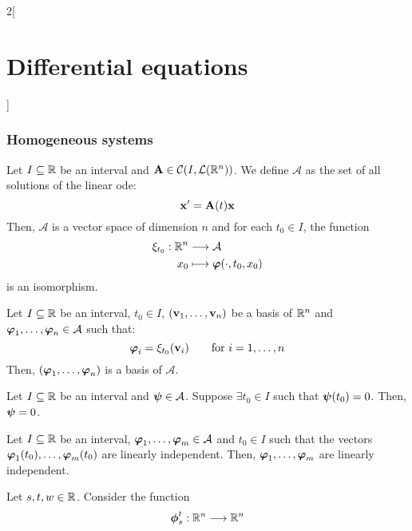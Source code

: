 \documentclass[../../../main.tex]{subfiles}
\begin{document}
\begin{multicols}{2}[\section{Differential equations}]
  \subsubsection{Homogeneous systems}
  \begin{theorem}
    Let $I\subseteq\mathbb{R}$ be an interval and $\boldsymbol{\mathrm{A}}\in\mathcal{C}(I,\mathcal{L}(\mathbb{R}^n))$. We define $\mathcal{A}$ as the set of all solutions of the linear ode:
    \begin{equation}\label{DE_homo}
      \boldsymbol{\mathrm{x}}'=\boldsymbol{\mathrm{A}}(t)\boldsymbol{\mathrm{x}}
    \end{equation} Then, $\mathcal{A}$ is a vector space of dimension $n$ and for each $t_0\in I$, the function
    \begin{align*}
      \xi_{t_0}:\mathbb{R}^n & \longrightarrow\mathcal{A}                         \\
      x_0             & \longmapsto\boldsymbol{\mathrm{\varphi}}(\cdot,t_0,x_0)
    \end{align*}
    is an isomorphism.
  \end{theorem}
  \begin{corollary}
    Let $I\subseteq\mathbb{R}$ be an interval, $t_0\in I$, $(\boldsymbol{\mathrm{v}}_1,\ldots,\boldsymbol{\mathrm{v}}_n)$ be a basis of $\mathbb{R}^n$ and $\boldsymbol{\mathrm{\varphi}}_1,\ldots,\boldsymbol{\mathrm{\varphi}}_n\in\mathcal{A}$ such that: $$\boldsymbol{\mathrm{\varphi}}_i=\xi_{t_0}(\boldsymbol{\mathrm{v}}_i)\qquad\text{for } i=1,\ldots,n$$
    Then, $(\boldsymbol{\mathrm{\varphi}}_1,\ldots,\boldsymbol{\mathrm{\varphi}}_n)$ is a basis of $\mathcal{A}$.
  \end{corollary}
  \begin{corollary}
    Let $I\subseteq\mathbb{R}$ be an interval and $\boldsymbol{\mathrm{\psi}}\in\mathcal{A}$. Suppose $\exists t_0\in I$ such that $\boldsymbol{\mathrm{\psi}} (t_0)=0$. Then, $\boldsymbol{\mathrm{\psi}}=0$.
  \end{corollary}
  \begin{corollary}
    Let $I\subseteq\mathbb{R}$ be an interval, $\boldsymbol{\mathrm{\varphi}}_1,\ldots,\boldsymbol{\mathrm{\varphi}}_m\in\mathcal{A}$ and $t_0\in I$ such that the vectors $\boldsymbol{\mathrm{\varphi}}_1(t_0),\ldots,\boldsymbol{\mathrm{\varphi}}_m(t_0)$ are linearly independent. Then, $\boldsymbol{\mathrm{\varphi}}_1,\ldots,\boldsymbol{\mathrm{\varphi}}_m$ are linearly independent.
  \end{corollary}
  \begin{corollary}
    Let $s,t,w\in\mathbb{R}$. Consider the function
    \begin{align*}
      \vectorfunction{\phi}_s^t:\RR^n & \longrightarrow\RR^n     \\

\end{align*}
\end{corollary}
\end{multicols}
\end{document}

